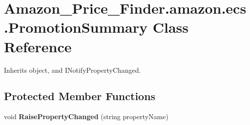 \hypertarget{class_amazon___price___finder_1_1amazon_1_1ecs_1_1_promotion_summary}{\section{Amazon\-\_\-\-Price\-\_\-\-Finder.\-amazon.\-ecs.\-Promotion\-Summary Class Reference}
\label{class_amazon___price___finder_1_1amazon_1_1ecs_1_1_promotion_summary}
}


 




Inherits object, and I\-Notify\-Property\-Changed.

\subsection*{Protected Member Functions}
\begin{DoxyCompactItemize}
\item 
\hypertarget{class_amazon___price___finder_1_1amazon_1_1ecs_1_1_promotion_summary_a03810c70a0ab62691c6bb84f50a97742}{void {\bfseries Raise\-Property\-Changed} (string property\-Name)}\label{class_amazon___price___finder_1_1amazon_1_1ecs_1_1_promotion_summary_a03810c70a0ab62691c6bb84f50a97742}

\end{DoxyCompactItemize}
